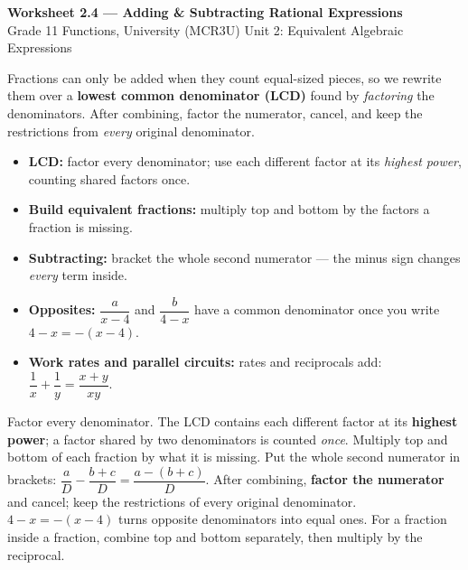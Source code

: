 \documentclass[11pt]{article}
\begin{document}
\begin{center}
{\LARGE\bfseries\color{titleblue}Worksheet 2.4 --- Adding \& Subtracting Rational Expressions}\\[2pt]
{\small Grade 11 Functions, University (MCR3U) \textperiodcentered{} Unit 2: Equivalent Algebraic Expressions}
\end{center}

\begin{ideabox}
Fractions can only be added when they count equal-sized pieces, so we rewrite them over a \textbf{lowest common denominator (LCD)} found by \emph{factoring} the denominators. After combining, factor the numerator, cancel, and keep the restrictions from \emph{every} original denominator.
\begin{itemize}[leftmargin=*,itemsep=2pt]
  \item \textbf{LCD:} factor every denominator; use each different factor at its \emph{highest power}, counting shared factors once.
  \item \textbf{Build equivalent fractions:} multiply top and bottom by the factors a fraction is missing.
  \item \textbf{Subtracting:} bracket the whole second numerator --- the minus sign changes \emph{every} term inside.
  \item \textbf{Opposites:} $\dfrac{a}{x-4}$ and $\dfrac{b}{4-x}$ have a common denominator once you write $4-x=-(x-4)$.
  \item \textbf{Work rates and parallel circuits:} rates and reciprocals add: $\dfrac1x+\dfrac1y=\dfrac{x+y}{xy}$.
\end{itemize}
\end{ideabox}

\begin{learnbox}
Factor every denominator. The LCD contains each different factor at its \textbf{highest power}; a factor shared by two denominators is counted \emph{once}. Multiply top and bottom of each fraction by what it is missing.
Put the whole second numerator in brackets: $\dfrac{a}{D}-\dfrac{b+c}{D}=\dfrac{a-(b+c)}{D}$. After combining, \textbf{factor the numerator} and cancel; keep the restrictions of every original denominator.
$4-x=-(x-4)$ turns opposite denominators into equal ones. For a fraction inside a fraction, combine top and bottom separately, then multiply by the reciprocal.
\end{learnbox}
\end{document}
